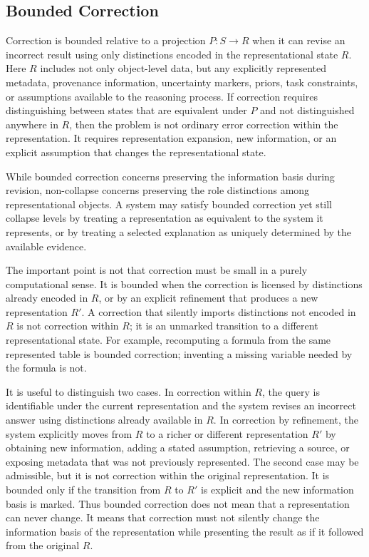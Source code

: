 \documentclass[11pt]{article}
\begin{document}
\subsection{Bounded Correction}

Correction is bounded relative to a projection $P:S\rightarrow R$ when it can revise an incorrect result using only distinctions encoded in the representational state $R$. Here $R$ includes not only object-level data, but any explicitly represented metadata, provenance information, uncertainty markers, priors, task constraints, or assumptions available to the reasoning process. If correction requires distinguishing between states that are equivalent under $P$ and not distinguished anywhere in $R$, then the problem is not ordinary error correction within the representation. It requires representation expansion, new information, or an explicit assumption that changes the representational state.

While bounded correction concerns preserving the information basis during revision, non-collapse concerns preserving the role distinctions among representational objects. A system may satisfy bounded correction yet still collapse levels by treating a representation as equivalent to the system it represents, or by treating a selected explanation as uniquely determined by the available evidence.

The important point is not that correction must be small in a purely computational sense. It is bounded when the correction is licensed by distinctions already encoded in $R$, or by an explicit refinement that produces a new representation $R'$. A correction that silently imports distinctions not encoded in $R$ is not correction within $R$; it is an unmarked transition to a different representational state. For example, recomputing a formula from the same represented table is bounded correction; inventing a missing variable needed by the formula is not.

It is useful to distinguish two cases. In correction within $R$, the query is identifiable under the current representation and the system revises an incorrect answer using distinctions already available in $R$. In correction by refinement, the system explicitly moves from $R$ to a richer or different representation $R'$ by obtaining new information, adding a stated assumption, retrieving a source, or exposing metadata that was not previously represented. The second case may be admissible, but it is not correction within the original representation. It is bounded only if the transition from $R$ to $R'$ is explicit and the new information basis is marked. Thus bounded correction does not mean that a representation can never change. It means that correction must not silently change the information basis of the representation while presenting the result as if it followed from the original $R$.
\end{document}
